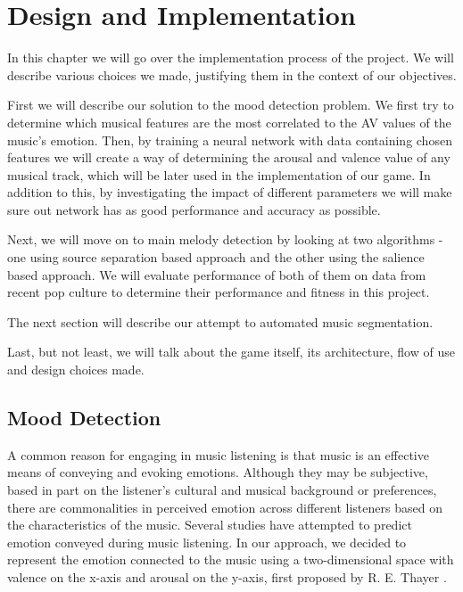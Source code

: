
\chapter{Design and Implementation} %

\label{Chapter5} %



In this chapter we will go over the implementation process of the project. We will describe various choices we made, justifying them in the context of our objectives. 

First we will describe our solution to the mood detection problem. We first try to determine which musical features are the most correlated to the AV values of the music's emotion. Then, by training a neural network with data containing chosen features we will create a way of determining the arousal and valence value of any musical track, which will be later used in the implementation of our game. In addition to this, by investigating the impact of different parameters we will make sure out network has as good performance and accuracy as possible.

Next, we will move on to main melody detection by looking at two algorithms - one using source separation based approach and the other using the salience based approach. We will evaluate performance of both of them on data from recent pop culture to determine their performance and fitness in this project.

The next section will describe our attempt to automated music segmentation.

Last, but not least, we will talk about the game itself, its architecture, flow of use and design choices made.

\vspace{20pt}

\section{Mood Detection}

A common reason for engaging in music listening is that music is an effective means of conveying and evoking emotions. Although they may be subjective, based in part on the listener’s cultural and musical background or preferences, there are commonalities in perceived emotion across different listeners based on the characteristics of the music. Several studies have attempted to predict emotion conveyed during music listening. In our approach, we decided to represent the emotion connected to the music using a two-dimensional space with valence on the x-axis and arousal on the y-axis, first proposed by R. E. Thayer \cite{Thayer}.

